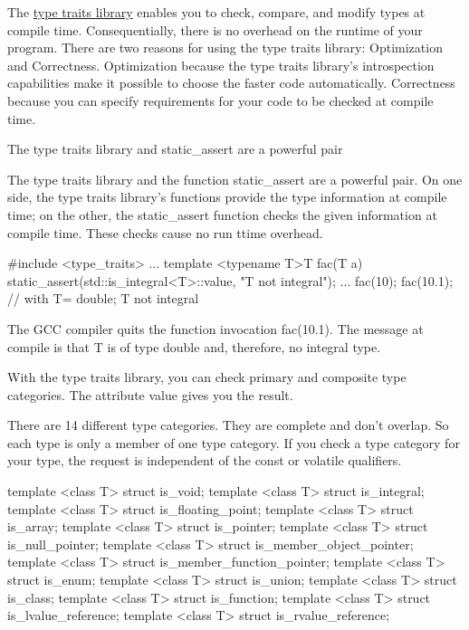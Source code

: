 The \href{http://en.cppreference.com/w/cpp/header/type_traits}{type traits library} enables you to check, compare, and modify types at compile time. Consequentially, there is no overhead on the runtime of your program. There are two reasons for using the type traits library: Optimization and Correctness. Optimization because the type traits library’s introspection capabilities make it possible to choose the faster code automatically. Correctness because you can specify requirements for your code to be checked at compile time.

\begin{myTip}{The type traits library and static\_assert are a powerful pair}
	
The type traits library and the function static\_assert are a powerful pair. On one side, the type traits library’s functions provide the type information at compile time; on the other, the static\_assert function checks the given information at compile time. These checks cause no run ttime overhead.

\begin{cpp}
#include <type_traits>
...
template <typename T>T fac(T a){
	static_assert(std::is_integral<T>::value, "T not integral");
	...
}
fac(10);
fac(10.1); // with T= double; T not integral
\end{cpp}

The GCC compiler quits the function invocation fac(10.1). The message at compile is that T is of type double and, therefore, no integral type.
	
\end{myTip}


With the type traits library, you can check primary and composite type categories. The attribute value gives you the result.


There are 14 different type categories. They are complete and don’t overlap. So each type is only a member of one type category. If you check a type category for your type, the request is independent of the const or volatile qualifiers.

\begin{cpp}
template <class T> struct is_void;
template <class T> struct is_integral;
template <class T> struct is_floating_point;
template <class T> struct is_array;
template <class T> struct is_pointer;
template <class T> struct is_null_pointer;
template <class T> struct is_member_object_pointer;
template <class T> struct is_member_function_pointer;
template <class T> struct is_enum;
template <class T> struct is_union;
template <class T> struct is_class;
template <class T> struct is_function;
template <class T> struct is_lvalue_reference;
template <class T> struct is_rvalue_reference;
\end{cpp}

